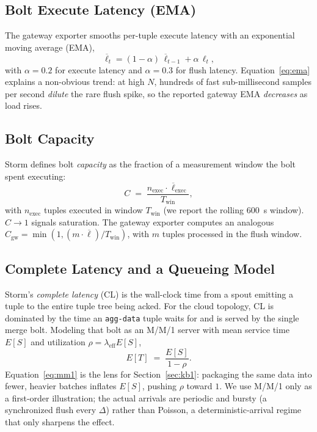 \documentclass[conference]{IEEEtran}
\newcommand{\code}[1]{\texttt{#1}}
\begin{document}
\subsection{Bolt Execute Latency (EMA)}
The gateway exporter smooths per-tuple execute latency with an exponential moving
average (EMA),
\begin{equation}
\overline{\ell}_t = (1-\alpha)\,\overline{\ell}_{t-1} + \alpha\,\ell_t,
\label{eq:ema}
\end{equation}
with $\alpha=0.2$ for execute latency and $\alpha=0.3$ for flush latency.
Equation~\eqref{eq:ema} explains a non-obvious trend: at high $N$, hundreds of
fast sub-millisecond samples per second \emph{dilute} the rare flush spike, so the
reported gateway EMA \emph{decreases} as load rises.

\subsection{Bolt Capacity}
Storm defines bolt \emph{capacity} as the fraction of a measurement window the
bolt spent executing:
\begin{equation}
C \;=\; \frac{n_{\text{exec}}\cdot \overline{\ell}_{\text{exec}}}{T_{\text{win}}},
\label{eq:cap}
\end{equation}
with $n_{\text{exec}}$ tuples executed in window $T_{\text{win}}$ (we report the
rolling \SI{600}{\second} window). $C\to 1$ signals saturation. The gateway
exporter computes an analogous
$C_{\text{gw}}=\min(1, (m\cdot\overline{\ell})/T_{\text{win}})$, with $m$ tuples
processed in the flush window.

\subsection{Complete Latency and a Queueing Model}
Storm's \emph{complete latency} (CL) is the wall-clock time from a spout emitting
a tuple to the entire tuple tree being acked. For the cloud topology, CL is
dominated by the time an \code{agg-data} tuple waits for and is served by the
single merge bolt. Modeling that bolt as an M/M/1 server with mean service time
$E[S]$ and utilization $\rho=\lambda_{\text{eff}}E[S]$,
\begin{equation}
E[T] \;=\; \frac{E[S]}{1-\rho}.
\label{eq:mm1}
\end{equation}
Equation~\eqref{eq:mm1} is the lens for Section~\ref{sec:kb1}: packaging the same
data into fewer, heavier batches inflates $E[S]$, pushing $\rho$ toward $1$. We
use M/M/1 only as a first-order illustration; the actual arrivals are periodic
and bursty (a synchronized flush every $\Delta$) rather than Poisson, a
deterministic-arrival regime that only sharpens the effect.
\end{document}

